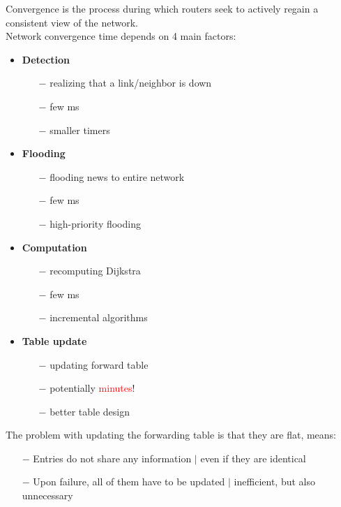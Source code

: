 \documentclass[a4paper, fontsize=8pt, landscape, DIV=1]{scrartcl}
\begin{document}
\begin{multicols*}{4}
   		Convergence is the process during which routers seek to actively regain a consistent view of the network.\\
   		Network convergence time depends on 4 main factors:
   		\begin{itemize}[noitemsep]
   			\item \textbf{Detection}
   			\begin{itemize}
   				\item[$-$] realizing that a link/neighbor is down
   				\item[$-$] few ms
   				\item[$-$] smaller timers
   			\end{itemize} 
   			\item \textbf{Flooding}
   			\begin{itemize}
   				\item[$-$] flooding news to entire network
   				\item[$-$] few ms
   				\item[$-$] high-priority flooding
   			\end{itemize}  
   			\item \textbf{Computation}
   			\begin{itemize}
   				\item[$-$] recomputing Dijkstra
   				\item[$-$] few ms
   				\item[$-$] incremental algorithms
   			\end{itemize}
   			\item \textbf{Table update}
   			\begin{itemize}
   				\item[$-$] updating forward table
   				\item[$-$] potentially \textcolor{Red}{minutes}!
   				\item[$-$] better table design
   			\end{itemize}
   		\end{itemize} 
   		The problem with updating the forwarding table is that they are flat, means:
   		\vspace{-0.2cm}
   		\begin{itemize}[noitemsep]
   			\item[$-$] Entries do not share any information $\vert$ even if they are identical
   			\item[$-$] Upon failure, all of them have to be updated $\vert$ inefficient, but also unnecessary 
   		\end{itemize} 

\end{multicols*}
\end{document}
